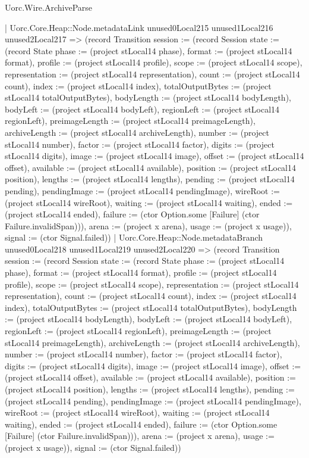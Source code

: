 \begin{lexlean}{Uorc.Wire.ArchiveParse}
\begin{semanticmodule}
{            | Uorc.Core.Heap::Node.metadataLink unused0Local215 unused1Local216 unused2Local217 => (record Transition {session := (record Session {state := (record State {phase := (project stLocal14 phase), format := (project stLocal14 format), profile := (project stLocal14 profile), scope := (project stLocal14 scope), representation := (project stLocal14 representation), count := (project stLocal14 count), index := (project stLocal14 index), totalOutputBytes := (project stLocal14 totalOutputBytes), bodyLength := (project stLocal14 bodyLength), bodyLeft := (project stLocal14 bodyLeft), regionLeft := (project stLocal14 regionLeft), preimageLength := (project stLocal14 preimageLength), archiveLength := (project stLocal14 archiveLength), number := (project stLocal14 number), factor := (project stLocal14 factor), digits := (project stLocal14 digits), image := (project stLocal14 image), offset := (project stLocal14 offset), available := (project stLocal14 available), position := (project stLocal14 position), lengths := (project stLocal14 lengths), pending := (project stLocal14 pending), pendingImage := (project stLocal14 pendingImage), wireRoot := (project stLocal14 wireRoot), waiting := (project stLocal14 waiting), ended := (project stLocal14 ended), failure := (ctor Option.some [Failure] (ctor Failure.invalidSpan))}), arena := (project x arena), usage := (project x usage)}), signal := (ctor Signal.failed)})
            | Uorc.Core.Heap::Node.metadataBranch unused0Local218 unused1Local219 unused2Local220 => (record Transition {session := (record Session {state := (record State {phase := (project stLocal14 phase), format := (project stLocal14 format), profile := (project stLocal14 profile), scope := (project stLocal14 scope), representation := (project stLocal14 representation), count := (project stLocal14 count), index := (project stLocal14 index), totalOutputBytes := (project stLocal14 totalOutputBytes), bodyLength := (project stLocal14 bodyLength), bodyLeft := (project stLocal14 bodyLeft), regionLeft := (project stLocal14 regionLeft), preimageLength := (project stLocal14 preimageLength), archiveLength := (project stLocal14 archiveLength), number := (project stLocal14 number), factor := (project stLocal14 factor), digits := (project stLocal14 digits), image := (project stLocal14 image), offset := (project stLocal14 offset), available := (project stLocal14 available), position := (project stLocal14 position), lengths := (project stLocal14 lengths), pending := (project stLocal14 pending), pendingImage := (project stLocal14 pendingImage), wireRoot := (project stLocal14 wireRoot), waiting := (project stLocal14 waiting), ended := (project stLocal14 ended), failure := (ctor Option.some [Failure] (ctor Failure.invalidSpan))}), arena := (project x arena), usage := (project x usage)}), signal := (ctor Signal.failed)})
}
\end{semanticmodule}
\end{lexlean}
